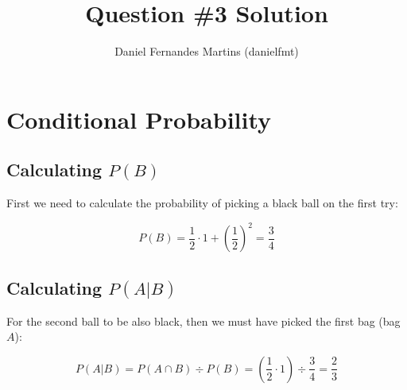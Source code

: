\documentclass{article}
\author{Daniel Fernandes Martins (danielfmt)}
\title{Question \#3 Solution}
\begin{document}
\maketitle

\section{Conditional Probability}

\subsection{Calculating $P(B)$}

First we need to calculate the probability of picking a black ball on the
first try:

\begin{equation*}
P(B) = \frac{1}{2} \cdot 1 + \left( \frac{1}{2} \right)^2 = \frac{3}{4}
\end{equation*}

\subsection{Calculating $P(A|B)$}

For the second ball to be also black, then we must have picked the first bag
(bag $A$):

\begin{equation*}
P(A|B) = P(A \cap B) \div P(B) = \left( \frac{1}{2} \cdot 1 \right) \div \frac{3}{4} = \frac{2}{3}
\end{equation*}
\end{document}
